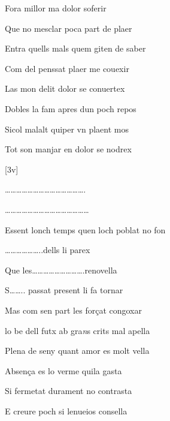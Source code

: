 \begin{estrofa}

 Fora millor ma dolor soferir

 Que no mesclar poca part de plaer

 Entra quells mals quem giten de saber

 Com del penssat plaer me couexir

 Las mon delit dolor se conuertex

 Dobles la fam apres dun poch repos

 Sicol malalt quiper vn plaent mos

 Tot son manjar en dolor se nodrex

\end{estrofa}



[3v]
\begin{estrofa}

 \ldots{}\ldots{}\ldots{}\ldots{}\ldots{}\ldots{}\ldots{}\ldots{}\ldots{}\ldots{}\ldots{}\ldots{}\ldots{}\ldots{}.

 \ldots{}\ldots{}\ldots{}\ldots{}\ldots{}\ldots{}\ldots{}\ldots{}\ldots{}\ldots{}\ldots{}\ldots{}\ldots{}\ldots{}\ldots{}

 Essent lonch temps quen loch poblat no fon

 \ldots{}\ldots{}\ldots{}\ldots{}\ldots{}\ldots{}..dells li parex

 Que les\ldots{}\ldots{}\ldots{}\ldots{}\ldots{}\ldots{}\ldots{}\ldots{}\ldots{}.renovella

 S\ldots{}\ldots{}.. passat present li fa tornar

 Mas com sen part les for\c{c}at congoxar

 lo be dell futx ab gra\textit{n}s crits mal apella

\end{estrofa}



\begin{tornada}

 Plena de seny quant amor es molt vella

 Absen\c{c}a es lo verme quila gasta

 Si fermetat durament no contrasta

 E creure poch si lenueios consella

\end{tornada}




